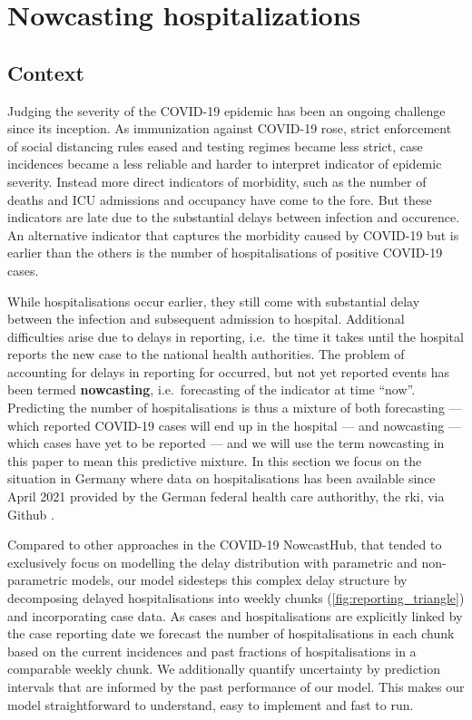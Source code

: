 \section{Nowcasting hospitalizations}%
\label{sec:nowcasting_hospitalizations}
\subsection{Context}
Judging the severity of the COVID-19 epidemic has been an ongoing challenge since its inception. As immunization against COVID-19 rose, strict enforcement of social distancing rules eased and testing regimes became less strict, case incidences became a less reliable and harder to interpret indicator of epidemic severity. Instead more direct indicators of morbidity, such as the number of deaths and ICU admissions and occupancy have come to the fore. But these indicators are late due to the substantial delays between infection and occurence. An alternative indicator that captures the morbidity caused by COVID-19 but is earlier than the others is the number of hospitalisations of positive COVID-19
cases.

While hospitalisations occur earlier, they still come with substantial delay between the infection and subsequent admission to hospital. Additional difficulties arise due to delays in reporting, i.e.~the time it takes until the hospital reports the new case to the national health authorities. The problem of accounting for delays in reporting for occurred, but not yet reported events has been termed \textbf{nowcasting}, i.e.~forecasting of the indicator at time ``now''. Predicting the number of hospitalisations is thus a mixture of both forecasting --- which reported COVID-19 cases will end up in the hospital --- and nowcasting --- which cases have yet to be reported --- and we will use the term nowcasting in this paper to mean this predictive mixture. In this section we focus on the situation in Germany where data on hospitalisations has been available since April 2021 provided by the German federal health care authorithy, the \gls{rki}, via Github \citep{RobertKoch-Institut2021COVID19Hospitalisierungen}. 

Compared to other approaches in the COVID-19 NowcastHub, that tended to exclusively focus on modelling the delay distribution with parametric and non-parametric models, our model sidesteps this complex delay structure by decomposing delayed hospitalisations into weekly chunks (\cref{fig:reporting_triangle}) and incorporating case data. As cases and hospitalisations are explicitly linked by the case reporting date we forecast the number of hospitalisations in each chunk based on the current incidences and past fractions of hospitalisations in a comparable weekly chunk. We additionally quantify uncertainty by prediction intervals that are informed by the past performance of our model. This makes our model straightforward to understand, easy to implement and fast to run.


